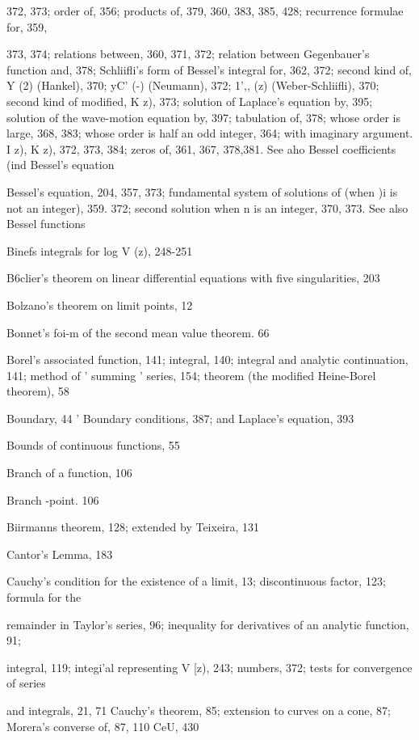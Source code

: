 372, 373; order of, 356; products of, 379, 360, 383, 385, 428; recurrence formulae for, 359,

373, 374; relations between, 360, 371, 372; relation between Gegenbauer's function and,
378; Schliifli's form of Bessel's integral for, 362, 372; second kind of, Y (2) (Hankel), 370;
yC' (-) (Neumann), 372; 1',, (z) (Weber-Schliifli), 370; second kind of modified, K  z), 373;
solution of Laplace's equation by, 395; solution of the wave-motion equation by, 397;
tabulation of, 378; whose order is large, 368, 383; whose order is half an odd integer, 364;
with imaginary argument. I  z), K  z), 372, 373, 384; zeros of, 361, 367, 378,381. See
aho Bessel coefficients (ind Bessel's equation

Bessel's equation, 204, 357, 373; fundamental system of solutions of (when )i is not an integer),
359. 372; second solution when n is an integer, 370, 373. See also Bessel functions

Binefs integrals for log V (z), 248-251

B6clier's theorem on linear differential equations with five singularities, 203

Bolzano's theorem on limit points, 12

Bonnet's foi-m of the second mean value theorem. 66

Borel's associated function, 141; integral, 140; integral and analytic continuation, 141; method
of ' summing ' series, 154; theorem (the modified Heine-Borel theorem), 58

Boundary, 44
 ' Boundary conditions, 387; and Laplace's equation, 393

Bounds of continuous functions, 55

Branch of a function, 106

Branch -point. 106

Biirmanns theorem, 128; extended by Teixeira, 131

Cantor's Lemma, 183

Cauchy's condition for the existence of a limit, 13; discontinuous factor, 123; formula for the

remainder in Taylor's series, 96; inequality for derivatives of an analytic function, 91;

integral, 119; integi'al representing V [z), 243; numbers, 372; tests for convergence of series

and integrals, 21, 71
Cauchy's theorem, 85; extension to curves on a cone, 87; Morera's converse of, 87, 110
CeU, 430

